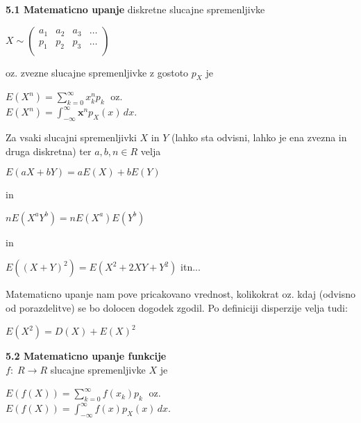 \documentclass{article}
\begin{document}
\begin{multicols}{2}
\textbf{5.1 Matematicno upanje} diskretne slucajne spremenljivke
\begin{center}
    \begin{small}
        \begin{math}
            X \sim
            \begin{pmatrix}
                a_{1} & a_{2} & a_{3} & \dots \\
                p_{1} & p_{2} & p_{3} & \dots \\
            \end{pmatrix}
        \end{math}
    \end{small}
\end{center}
oz. zvezne slucajne spremenljivke z gostoto $p_X$ je
\begin{center}
    \begin{math}
        E(X^n) = \sum_{k=0}^{\infty} x_k^n p_k\;
    \end{math} oz.\\
    \begin{math}
        E(X^n) = \int_{- \infty}^{ \infty} \textbf{x}^n p_X(x)\, dx
    \end{math}.
\end{center}
Za vsaki slucajni spremenljivki $X$ in $Y$ (lahko sta odvisni, lahko je ena zvezna in druga diskretna)
ter $a, b, n \in R$ velja 
\begin{center}
    \begin{math}
        E(aX + bY) = aE(X) + bE(Y)
    \end{math}
\end{center} in
\begin{center}
    \begin{math}
        nE(X^a Y^b) = nE(X^a) E(Y^b)
    \end{math}
\end{center} in
\begin{center}
    \begin{math}
        E((X + Y)^2) = E(X^2 + 2XY + Y^2)
    \end{math} itn...
\end{center}
Matematicno upanje nam pove pricakovano vrednost, kolikokrat oz. kdaj (odvisno od porazdelitve) 
se bo dolocen dogodek zgodil. Po definiciji disperzije velja tudi:
\begin{center}
    $E(X^2) = D(X) + E(X)^2$    
\end{center}

\textbf{5.2 Matematicno upanje funkcije}\\
$f:\; R \rightarrow R$ slucajne spremenljivke $X$ je
\begin{center}
    \begin{math}
        E(f(X)) = \sum_{k=0}^{\infty} f(x_k) p_k\;
    \end{math} oz.\\
    \begin{math}
        E(f(X)) = \int_{- \infty}^{ \infty} f(x) p_X (x)\, dx
    \end{math}.
\end{center}


\end{multicols}
\end{document}
